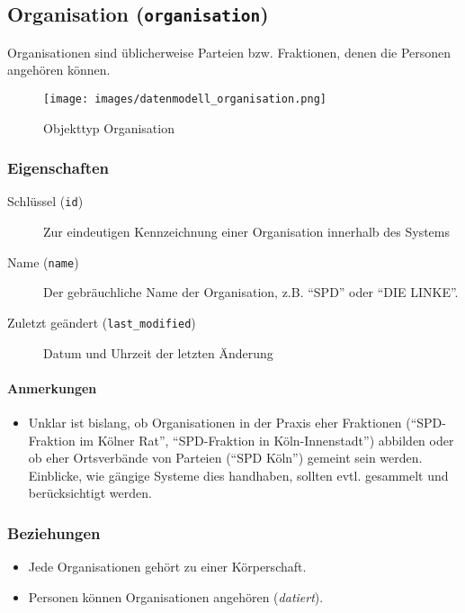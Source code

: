 \documentclass[,a4paper]{article}
\makeatletter
\def\maxwidth{\ifdim\Gin@nat@width>\linewidth\linewidth
\else\Gin@nat@width\fi}
\let\Oldincludegraphics\includegraphics
\renewcommand{\includegraphics}[1]{\Oldincludegraphics[width=\maxwidth]{#1}}
\makeatother
\begin{document}
\subsection{Organisation (\texttt{organisation})}

Organisationen sind üblicherweise Parteien bzw. Fraktionen, denen die
Personen angehören können.

\begin{figure}[htbp]
\centering
\texttt{[image: images/datenmodell\_organisation.png]}
\caption{Objekttyp Organisation}
\end{figure}

\subsubsection{Eigenschaften}

\begin{description}
\item[Schlüssel (\texttt{id})]
Zur eindeutigen Kennzeichnung einer Organisation innerhalb des Systems
\item[Name (\texttt{name})]
Der gebräuchliche Name der Organisation, z.B. ``SPD'' oder ``DIE
LINKE''.
\item[Zuletzt geändert (\texttt{last\_modified})]
Datum und Uhrzeit der letzten Änderung
\end{description}

\paragraph{Anmerkungen}

\begin{itemize}
\item
  Unklar ist bislang, ob Organisationen in der Praxis eher Fraktionen
  (``SPD-Fraktion im Kölner Rat'', ``SPD-Fraktion in Köln-Innenstadt'')
  abbilden oder ob eher Ortsverbände von Parteien (``SPD Köln'') gemeint
  sein werden. Einblicke, wie gängige Systeme dies handhaben, sollten
  evtl. gesammelt und berücksichtigt werden.
\end{itemize}

\subsubsection{Beziehungen}

\begin{itemize}
\item
  Jede Organisationen gehört zu einer Körperschaft.
\item
  Personen können Organisationen angehören (\emph{datiert}).
\end{itemize}
\end{document}
